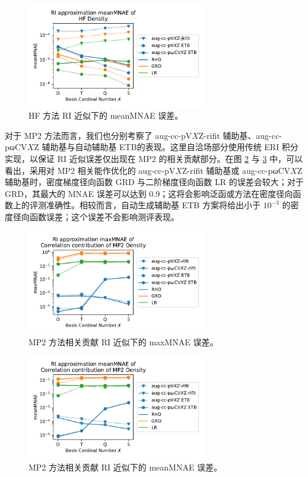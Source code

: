 \begin{figure}[t]
  \centering
  \includegraphics[width=0.7\textwidth]{assets/HF-RI-mean.pdf}
  \caption{HF 方法 RI 近似下的 meanMNAE 误差。}
  \label{fig.4.HF-RI-mean}
\end{figure}

对于 MP2 方法而言，我们也分别考察了 aug-cc-pV$X$Z-rifit 辅助基、aug-cc-pωCV$X$Z 辅助基与自动辅助基 ETB\cite{Stoychev-Neese.JCTC.2017}的表现。这里自洽场部分使用传统 ERI 积分实现，以保证 RI 近似误差仅出现在 MP2 的相关贡献部分。在图 \ref{fig.4.MP2-RI-err} 与 \ref{fig.4.MP2-RI-mean} 中，可以看出，采用对 MP2 相关能作优化的 aug-cc-pV$X$Z-rifit 辅助基或 aug-cc-pωCV$X$Z 辅助基时，密度梯度径向函数 GRD 与二阶梯度径向函数 LR 的误差会较大；对于 GRD，其最大的 MNAE 误差可以达到 0.9；这将会影响泛函或方法在密度径向函数上的评测准确性。相较而言，自动生成辅助基 ETB 方案将给出小于 $10^{-3}$ 的密度径向函数误差；这个误差不会影响测评表现。

\begin{figure}[t]
  \centering
  \includegraphics[width=0.7\textwidth]{assets/MP2-RI-err.pdf}
  \caption{MP2 方法相关贡献 RI 近似下的 maxMNAE 误差。}
  \label{fig.4.MP2-RI-err}
\end{figure}

\begin{figure}[t]
  \centering
  \includegraphics[width=0.7\textwidth]{assets/MP2-RI-mean.pdf}
  \caption{MP2 方法相关贡献 RI 近似下的 meanMNAE 误差。}
  \label{fig.4.MP2-RI-mean}
\end{figure}

